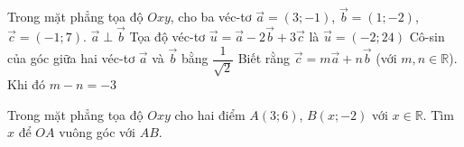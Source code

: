 \begin{ex}%
	Trong mặt phẳng tọa độ $Oxy$, cho ba véc-tơ  $\overrightarrow{a}=(3;-1)$, $\overrightarrow{b}=(1;-2)$, $\overrightarrow{c}=(-1;7)$.
	\choiceTF 
		{$\overrightarrow{a}\perp  \overrightarrow{b}$}
		{\True Tọa độ véc-tơ $\overrightarrow{u}=\overrightarrow{a}-2\overrightarrow{b}+3\overrightarrow{c}$ là  $\overrightarrow{u}=(-2;24)$}
		{\True Cô-sin của góc  giữa hai véc-tơ $\overrightarrow{a}$ và $\overrightarrow{b}$ bằng $\dfrac{1}{\sqrt{2}}$}
		{Biết rằng $\overrightarrow{c}=m\overrightarrow{a}+n\overrightarrow{b}$ (với  $m,n\in \mathbb{R}$). Khi đó $m-n=-3$}
\end{ex}


\begin{bt}%
	Trong mặt phẳng tọa độ $Oxy$ cho hai  điểm $A(3;6)$, $B(x;-2)$ với $x\in\mathbb{R}$. Tìm $x$ để $OA$ vuông góc với $AB$.
\end{bt}


